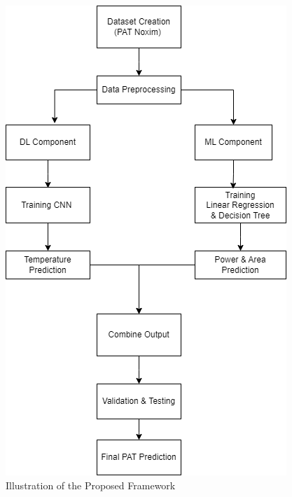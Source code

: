\documentclass[conference]{IEEEtran}
\begin{document}
\begin{figure}[H]  %
    \centering
    \includegraphics[width=0.8\linewidth]{Proposed.png}  %
    \caption{Illustration of the Proposed Framework}  %
    \label{fig:proposed_framework}  %
\end{figure}
\end{document}
